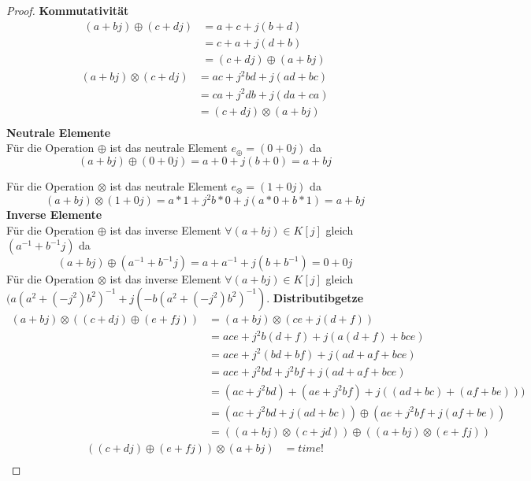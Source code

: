 \documentclass{../problemset}
\begin{document}
\begin{problem}
\begin{proof}
	\textbf{Kommutativität} \\
	\begin{align}
		(a + bj) \oplus (c + dj) & = a + c + j(b + d)         \\
		                         & = c + a + j(d + b)         \\
		                         & = (c + dj) \oplus (a + bj)
	\end{align}
	\begin{align}
		(a + bj) \otimes (c + dj) & = ac + j^2bd + j(ad + bc)   \\
		                          & = ca + j^2db + j(da + ca)   \\
		                          & = (c + dj) \otimes (a + bj) \\
	\end{align}
	\textbf{Neutrale Elemente} \\
	Für die Operation $\oplus$ ist das neutrale Element $e_\oplus = (0+0j)$ da \[
		(a + bj) \oplus (0 + 0j)   = a + 0 + j(b + 0) = a + bj
	\]

	Für die Operation $\otimes$ ist das neutrale Element $e_\otimes = (1+0j)$ da \[
		(a + bj) \otimes (1 + 0j)  = a*1 + j^2b*0 + j(a*0 + b*1) = a + bj
	\]
	\textbf{Inverse Elemente} \\
	Für die Operation $\oplus$ ist das inverse Element $\forall (a + bj) \in K[j]$ gleich $(a^{-1}+b^{-1}j)$ da \[
		(a + bj) \oplus (a^{-1} + b^{-1}j) = a + a^{-1} + j(b + b^{-1}) = 0 + 0j
	\]
	Für die Operation $\otimes$ ist das inverse Element $\forall (a + bj) \in K[j]$ gleich $(a{(a^2+(-j^2)b^2)}^{-1} + j(-b{(a^2+(-j^2)b^2)}^{-1})$.
	\textbf{Distributibgetze} \\
	\begin{align}
		(a + bj) \otimes ((c + dj) \oplus (e + fj)) & = (a + bj) \otimes (ce + j(d + f))                               \\
		                                            & = ace + j^2b(d+f) + j(a(d+f) + bce)                              \\
		                                            & = ace + j^2(bd+bf) + j(ad+af + bce)                              \\
		                                            & = ace + j^2bd+j^2bf + j(ad+af + bce)                             \\
		                                            & = (ac + j^2bd) + (ae + j^2bf) + j((ad + bc) + (af + be)))        \\
		                                            & = (ac + j^2bd + j(ad + bc)) \oplus (ae + j^2bf + j(af + be))     \\
		                                            & = ((a + bj) \otimes (c + jd)) \oplus ((a + bj) \otimes (e + fj))
	\end{align}
	\begin{align}
		((c + dj) \oplus (e + fj)) \otimes (a + bj) & = time! \\
	\end{align}
\end{proof}


\end{problem}
\end{document}
